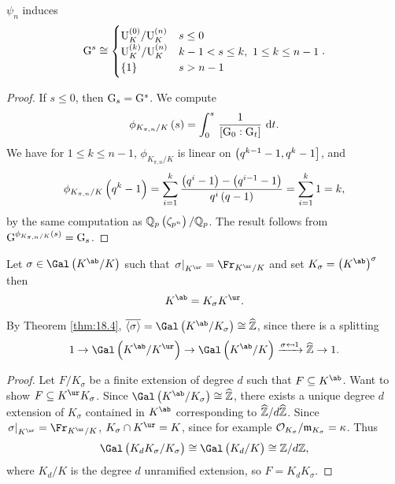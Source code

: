 \begin{corollary}
$ \psi_n $ induces
$$ \G^s \cong
\begin{cases}
\U_K^{\br{0}} / \U_K^{\br{n}} & s \le 0 \\
\U_K^{\br{k}} / \U_K^{\br{n}} & k - 1 < s \le k, \ 1 \le k \le n - 1 \\
\cbr{1} & s > n - 1
\end{cases}.
$$
\end{corollary}

\pagebreak

\begin{proof}
If $ s \le 0 $, then $ \mathrm{G}_s = \mathrm{G}^s $. We compute
$$ \phi_{K_{\pi, n} / K}\br{s} = \intd{0}{s}{\dfrac{1}{\sbr{\G_0 : \G_t}}}{t}. $$
We have for $ 1 \le k \le n - 1 $, $ \phi_{K_{\pi, n} / K} $ is linear on $ \intoc{q^{k - 1} - 1, q^k - 1} $, and
$$ \phi_{K_{\pi, n} / K}\br{q^k - 1} = \sum_{i = 1}^k \dfrac{\br{q^i - 1} - \br{q^{i - 1} - 1}}{q^i\br{q - 1}} = \sum_{i = 1}^k 1 = k, $$
by the same computation as $ \QQ_p\br{\zeta_{p^n}} / \QQ_p $. The result follows from $ \G^{\phi_{K_{\pi, n} / K}\br{s}} = \G_s $.
\end{proof}

\begin{proposition}
\label{prop:23.3}
Let $ \sigma \in \Gal\br{K^{\ab} / K} $ such that $ \eval{\sigma}_{K^{\ur}} = \Fr_{K^{\ur} / K} $ and set $ K_\sigma = \br{K^{\ab}}^\sigma $ then
$$ K^{\ab} = K_\sigma K^{\ur}. $$
\end{proposition}

\begin{fact*}
By Theorem \ref{thm:18.4}, $ \overline{\abr{\sigma}} = \Gal\br{K^{\ab} / K_\sigma} \cong \widehat{\ZZ} $, since there is a splitting
$$ 1 \to \Gal\br{K^{\ab} / K^{\ur}} \to \Gal\br{K^{\ab} / K} \xrightarrow{\sigma \mapsfrom 1} \widehat{\ZZ} \to 1. $$
\end{fact*}

\begin{proof}
Let $ F / K_\sigma $ be a finite extension of degree $ d $ such that $ F \subseteq K^{\ab} $. Want to show $ F \subseteq K^{\ur}K_\sigma $. Since $ \Gal\br{K^{\ab} / K_\sigma} \cong \widehat{\ZZ} $, there exists a unique degree $ d $ extension of $ K_\sigma $ contained in $ K^{\ab} $ corresponding to $ \widehat{\mathbb{Z}} / d\widehat{\mathbb{Z}} $. Since $ \eval{\sigma}_{K^{\ur}} = \Fr_{K^{\ur} / K} $, $ K_\sigma \cap K^{\ur} = K $, since for example $ \mathcal{O}_{K_\sigma} / \mathfrak{m}_{K_\sigma} = \kappa $. Thus
$$ \Gal\br{K_dK_\sigma / K_\sigma} \cong \Gal\br{K_d / K} \cong \ZZ / d\ZZ, $$
where $ K_d / K $ is the degree $ d $ unramified extension, so $ F = K_dK_\sigma $.
\end{proof}

